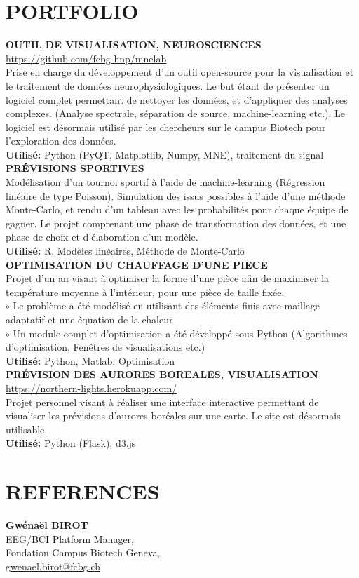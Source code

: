 \documentclass[]{cv-style}          %
\begin{document}
\section{PORTFOLIO}
  \textbf{OUTIL DE VISUALISATION, NEUROSCIENCES}\\
  \url{https://github.com/fcbg-hnp/mnelab}\\
  Prise en charge du développement d'un outil open-source pour la visualisation et le traitement de données neurophysiologiques. Le but étant de présenter un logiciel complet permettant de nettoyer les données, et d'appliquer des analyses complexes. (Analyse spectrale, séparation de source, machine-learning etc.). Le logiciel est désormais utilisé par les chercheurs sur le campus Biotech pour l'exploration des données.\\
  \textbf{Utilisé:} Python (PyQT, Matplotlib, Numpy, MNE), traitement du signal \\[0.4cm]
  \textbf{PRÉVISIONS SPORTIVES}\\
  Modélisation d'un tournoi sportif à l'aide de machine-learning (Régression linéaire de type Poisson). Simulation des issus possibles à l'aide d'une méthode Monte-Carlo, et rendu d'un tableau avec les probabilités pour chaque équipe de gagner. Le projet comprenant une phase de transformation des données, et une phase de choix et d'élaboration d'un modèle.\\
  \textbf{Utilisé:} R, Modèles linéaires, Méthode de Monte-Carlo \\[0.4cm]
  \textbf{OPTIMISATION DU CHAUFFAGE D'UNE PIECE}\\
  Projet d'un an visant à optimiser la forme d'une pièce afin de maximiser la température moyenne à l'intérieur, pour une pièce de taille fixée.\\
  $\circ$ Le problème a été modélisé en utilisant des éléments finis avec maillage adaptatif et une équation de la chaleur\\
  $\circ$ Un module complet d'optimisation a été développé sous Python (Algorithmes d'optimisation, Fenêtres de visualisations etc.)\\
  \textbf{Utilisé:} Python, Matlab, Optimisation \\[0.4cm]
  
  \textbf{PRÉVISION DES AURORES BOREALES, VISUALISATION}\\
  \url{https://northern-lights.herokuapp.com/}\\
  Projet personnel visant à réaliser une interface interactive permettant de visualiser les prévisions d'aurores boréales sur une carte. Le site est désormais utilisable.\\
  \textbf{Utilisé:} Python (Flask), d3.js \\[0.4cm]
\section{REFERENCES}
    \textbf{Gwénaël BIROT} \\
    EEG/BCI Platform Manager, \\
    Fondation Campus Biotech Geneva,\\
    \url{gwenael.birot@fcbg.ch}
\end{document}
